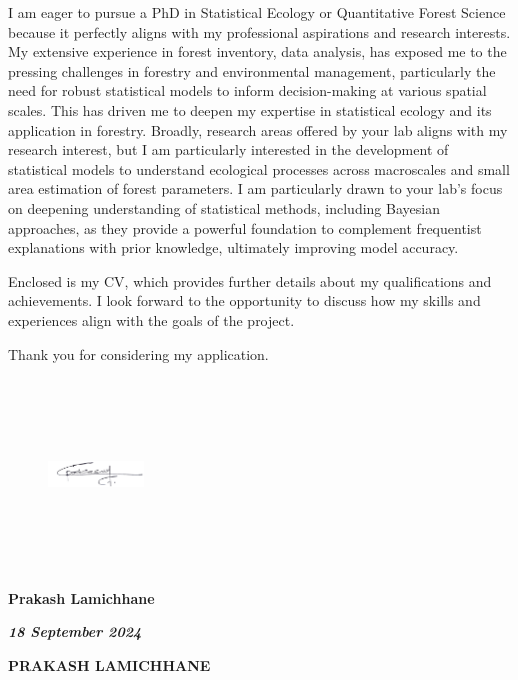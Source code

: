 \documentclass[
]{article}
\begin{document}
I am eager to pursue a PhD in Statistical Ecology or Quantitative Forest
Science because it perfectly aligns with my professional aspirations and
research interests. My extensive experience in forest inventory, data
analysis, has exposed me to the pressing challenges in forestry and
environmental management, particularly the need for robust statistical
models to inform decision-making at various spatial scales. This has
driven me to deepen my expertise in statistical ecology and its
application in forestry. Broadly, research areas offered by your lab
aligns with my research interest, but I am particularly interested in
the development of statistical models to understand ecological processes
across macroscales and small area estimation of forest parameters. I am
particularly drawn to your lab's focus on deepening understanding of
statistical methods, including Bayesian approaches, as they provide a
powerful foundation to complement frequentist explanations with prior
knowledge, ultimately improving model accuracy.

Enclosed is my CV, which provides further details about my
qualifications and achievements. I look forward to the opportunity to
discuss how my skills and experiences align with the goals of the
project.

Thank you for considering my application.

\vspace{1cm}

\begin{figure}[h]
    \includegraphics[width=1in, height=2in]{sign.png}
\end{figure}

\textbf{Prakash Lamichhane}

\textbf{\emph{18 September 2024}}

\newpage 
\Huge

\bf{PRAKASH LAMICHHANE}

\par

\normalsize
\mdseries
\end{document}
